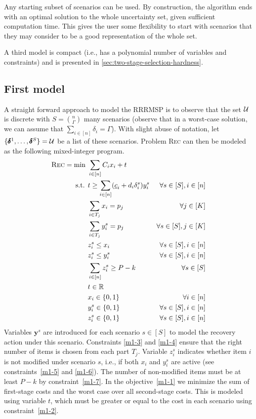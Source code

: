 Any starting subset of scenarios can be used. By construction, the algorithm ends with an optimal solution to the whole uncertainty set, given sufficient computation time. This gives the user some flexibility to start with scenarios that they may consider to be a good representation of the whole set.

A third model is compact (i.e., has a polynomial number of variables and constraints) and is presented in \cref{sec:two-stage-selection-hardness}.

\subsection{First model}
\label{sec:first}

A straight forward approach to model the RRRMSP is to observe that the set $\mathcal{U}$ is discrete with $S=\binom{n}{\Gamma}$ many scenarios (observe that in a worst-case solution, we can assume that $\sum_{i\in[n]} \delta_i = \Gamma$). With slight abuse of notation, let $\{ \pmb{\delta}^1,\ldots,\pmb{\delta}^S\} = \mathcal{U}$ be a list of these scenarios. Problem \textsc{Rec} can then be modeled as the following mixed-integer program.
\begin{subequations}
\label{eq:m1}  
\begin{align}
\textsc{Rec} = \min\ & \sum_{i\in [n]} C_i x_i + t \label{m1-1} \\
\text{s.t. } & t \ge \sum_{i\in[n]} (\underline{c}_i + d_i\delta^s_i) y^s_i & \forall s\in[S], i\in[n] \label{m1-2} \\
& \sum_{i\in T_j} x_i = p_j & \forall j\in[K] \label{m1-3} \\
& \sum_{i\in T_j} y^s_i = p_j & \forall s\in[S], j\in[K] \label{m1-4} \\
& z^s_i \le x_i & \forall s\in[S], i\in[n] \label{m1-5} \\
& z^s_i \le y^s_i & \forall s\in[S], i\in[n] \label{m1-6} \\
& \sum_{i\in[n]} z^s_i \ge P-k & \forall s\in[S] \label{m1-7} \\
& t \in \mathbb{R} \\
& x_i \in \{0,1\} & \forall i\in[n] \\
& y^s_i \in \{0,1\} & \forall s\in[S],i\in[n] \\
& z^s_i \in \{0,1\} & \forall s\in[S],i\in[n] \label{m1-end}
\end{align}
\end{subequations}
Variables $\pmb{y}^s$ are introduced for each scenario $s\in[S]$ to model the recovery action under this scenario. Constraints \eqref{m1-3} and \eqref{m1-4} ensure that the right number of items is chosen from each part $T_j$. Variable $z^s_i$ indicates whether item $i$ is not modified under scenario $s$, i.e., if both $x_i$ and $y^s_i$ are active (see constraints~\eqref{m1-5} and \eqref{m1-6}). The number of non-modified items must be at least $P-k$ by constraint~\eqref{m1-7}. In the objective~\eqref{m1-1} we minimize the sum of first-stage costs and the worst case over all second-stage costs. This is modeled using variable $t$, which must be greater or equal to the cost in each scenario using constraint~\eqref{m1-2}.


